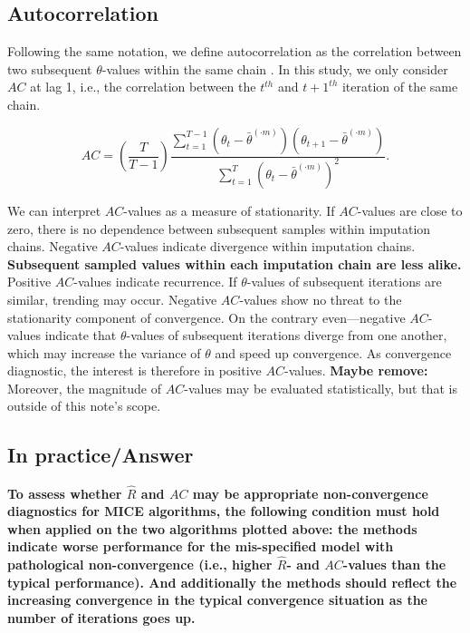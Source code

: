 \documentclass[Royal,times,sageh]{sagej}
\begin{document}
\hypertarget{autocorrelation}{%
\subsection{Autocorrelation}\label{autocorrelation}}

Following the same notation, we define autocorrelation as the
correlation between two subsequent \(\theta\)-values within the same
chain \citep[p.~147]{lync07}. In this study, we only consider \(AC\) at
lag 1, i.e., the correlation between the \(t^{th}\) and \(t+1^{th}\)
iteration of the same chain.

\begin{equation*}
AC = \left( \frac{T}{T-1} \right) \frac{\sum_{t=1}^{T-1}(\theta_t - \bar{\theta}^{(\cdot m)})(\theta_{t+1} - \bar{\theta}^{(\cdot m)})}{\sum_{t=1}^{T}(\theta_t - \bar{\theta}^{(\cdot m)})^2}.
\end{equation*}

We can interpret \(AC\)-values as a measure of stationarity. If
\(AC\)-values are close to zero, there is no dependence between
subsequent samples within imputation chains. Negative \(AC\)-values
indicate divergence within imputation chains. \textbf{Subsequent sampled
values within each imputation chain are less alike.} Positive
\(AC\)-values indicate recurrence. If \(\theta\)-values of subsequent
iterations are similar, trending may occur. Negative \(AC\)-values show
no threat to the stationarity component of convergence. On the contrary
even---negative \(AC\)-values indicate that \(\theta\)-values of
subsequent iterations diverge from one another, which may increase the
variance of \(\theta\) and speed up convergence. As convergence
diagnostic, the interest is therefore in positive \(AC\)-values.
\textbf{Maybe remove:} Moreover, the magnitude of \(AC\)-values may be
evaluated statistically, but that is outside of this note's scope.

\hypertarget{in-practiceanswer}{%
\subsection{In practice/Answer}\label{in-practiceanswer}}

\textbf{To assess whether \(\widehat{R}\) and \(AC\) may be appropriate
non-convergence diagnostics for MICE algorithms, the following condition
must hold when applied on the two algorithms plotted above: the methods
indicate worse performance for the mis-specified model with pathological
non-convergence (i.e., higher \(\widehat{R}\)- and \(AC\)-values than
the typical performance). And additionally the methods should reflect
the increasing convergence in the typical convergence situation as the
number of iterations goes up.}
\end{document}
